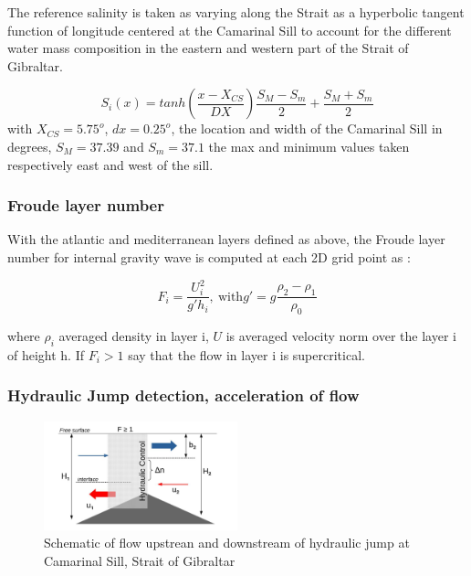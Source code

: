 The reference salinity is taken as varying along the Strait as a hyperbolic tangent function of longitude centered at the Camarinal Sill to account for the different water mass composition in the eastern and western part of the Strait of Gibraltar. 

\begin{equation}
	S_i(x)=tanh(\frac{x-X_{CS}}{DX})\frac{S_M-S_m}{2}+\frac{S_M+S_m}{2}
\end{equation}
with $X_{CS}=5.75^o$, $dx=0.25^o$, the location and width of the Camarinal Sill in degrees, $S_M=37.39$ and $S_m=37.1$ the max and minimum values taken respectively east and west of the sill.


\subsubsection{Froude layer number}

With the atlantic and mediterranean layers defined as above, the Froude layer number for internal gravity wave is computed at each 2D grid point as : 

\begin{equation}
F_i=\frac{U_i^2}{g'h_i} , \ \text{with} g'=g \frac{\rho_2-\rho_1}{\rho_0}
\end{equation}

where $\rho_i$ averaged density in layer i,  $U$ is averaged velocity norm over the layer i of height h. If $F_i>1$ say that the flow in layer i is supercritical.


\subsubsection{Hydraulic Jump detection, acceleration of flow}

\begin{figure}[!h]
 \centering
 \includegraphics[width=0.5\textwidth]{./GBR3D/schema_diagressaut.jpg}
 \caption {Schematic of flow upstrean and downstream of hydraulic jump at Camarinal Sill, Strait of Gibraltar}
  \label{schemaRH}
\end{figure}


